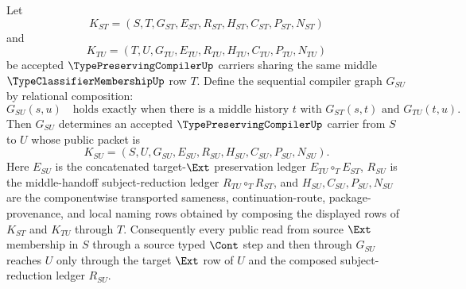 \begin{theorem}
\label{thm:type-preserving-compiler-sequential-composition}
Let
$$
K_{ST}=(S,T,G_{ST},E_{ST},R_{ST},H_{ST},C_{ST},P_{ST},N_{ST})
$$
and
$$
K_{TU}=(T,U,G_{TU},E_{TU},R_{TU},H_{TU},C_{TU},P_{TU},N_{TU})
$$
be accepted $\TypePreservingCompilerUp$ carriers sharing the same middle $\TypeClassifierMembershipUp$ row $T$. Define the sequential compiler graph $G_{SU}$ by relational composition:
$$
G_{SU}(s,u)\quad\text{holds exactly when there is a middle history }t\text{ with }G_{ST}(s,t)\text{ and }G_{TU}(t,u).
$$
Then $G_{SU}$ determines an accepted $\TypePreservingCompilerUp$ carrier from $S$ to $U$ whose public packet is
$$
K_{SU}=(S,U,G_{SU},E_{SU},R_{SU},H_{SU},C_{SU},P_{SU},N_{SU}).
$$
Here $E_{SU}$ is the concatenated target-$\Ext$ preservation ledger $E_{TU}\circ_T E_{ST}$, $R_{SU}$ is the middle-handoff subject-reduction ledger $R_{TU}\circ_T R_{ST}$, and $H_{SU},C_{SU},P_{SU},N_{SU}$ are the componentwise transported sameness, continuation-route, package-provenance, and local naming rows obtained by composing the displayed rows of $K_{ST}$ and $K_{TU}$ through $T$. Consequently every public read from source $\Ext$ membership in $S$ through a source typed $\Cont$ step and then through $G_{SU}$ reaches $U$ only through the target $\Ext$ row of $U$ and the composed subject-reduction ledger $R_{SU}$.
\end{theorem}
